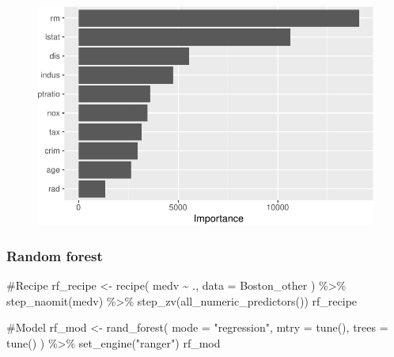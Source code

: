 \documentclass[
]{article}
\newenvironment{Shaded}{\begin{snugshade}}{\end{snugshade}}
\newcommand{\AttributeTok}[1]{\textcolor[rgb]{0.40,0.45,0.13}{#1}}
\newcommand{\CommentTok}[1]{\textcolor[rgb]{0.37,0.37,0.37}{#1}}
\newcommand{\FunctionTok}[1]{\textcolor[rgb]{0.28,0.35,0.67}{#1}}
\newcommand{\NormalTok}[1]{\textcolor[rgb]{0.00,0.23,0.31}{#1}}
\newcommand{\OtherTok}[1]{\textcolor[rgb]{0.00,0.23,0.31}{#1}}
\newcommand{\SpecialCharTok}[1]{\textcolor[rgb]{0.37,0.37,0.37}{#1}}
\newcommand{\StringTok}[1]{\textcolor[rgb]{0.13,0.47,0.30}{#1}}
\begin{document}
\begin{figure}[H]

{\centering \includegraphics{hw4_files/figure-pdf/unnamed-chunk-11-2.pdf}

}

\end{figure}

\hypertarget{random-forest}{%
\subsubsection{Random forest}\label{random-forest}}

\begin{Shaded}
\begin{Highlighting}[]
\CommentTok{\#Recipe}
\NormalTok{rf\_recipe }\OtherTok{\textless{}{-}} 
  \FunctionTok{recipe}\NormalTok{(}
\NormalTok{    medv }\SpecialCharTok{\textasciitilde{}}\NormalTok{ ., }
    \AttributeTok{data =}\NormalTok{ Boston\_other}
\NormalTok{  ) }\SpecialCharTok{\%\textgreater{}\%}
  \FunctionTok{step\_naomit}\NormalTok{(medv) }\SpecialCharTok{\%\textgreater{}\%}
  \FunctionTok{step\_zv}\NormalTok{(}\FunctionTok{all\_numeric\_predictors}\NormalTok{())}
\NormalTok{rf\_recipe}

\CommentTok{\#Model}
\NormalTok{rf\_mod }\OtherTok{\textless{}{-}} 
  \FunctionTok{rand\_forest}\NormalTok{(}
    \AttributeTok{mode =} \StringTok{"regression"}\NormalTok{,}
    \AttributeTok{mtry =} \FunctionTok{tune}\NormalTok{(),}
    \AttributeTok{trees =} \FunctionTok{tune}\NormalTok{()}
\NormalTok{  ) }\SpecialCharTok{\%\textgreater{}\%} 
  \FunctionTok{set\_engine}\NormalTok{(}\StringTok{"ranger"}\NormalTok{)}
\NormalTok{rf\_mod}
\end{Highlighting}
\end{Shaded}
\end{document}
